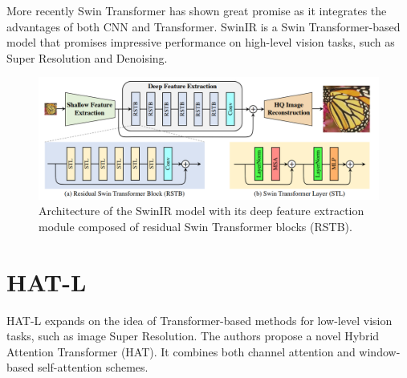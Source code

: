 More recently Swin Transformer\cite{liu2021swin}  has shown great promise as it integrates the advantages of both CNN and
Transformer. SwinIR\cite{liang2021swinir} is a Swin Transformer-based model that promises impressive performance on high-level vision tasks, such as Super Resolution and Denoising.

\begin{figure}[H]
  \centering
  \includegraphics[scale=0.35]{figures/SwinIR.png}
  \caption{Architecture of the SwinIR model with its deep feature extraction module composed of residual Swin Transformer blocks (RSTB)\cite{liang2021swinir}.}
  \label{img:swinir}
\end{figure}

\section{HAT-L}
\label{subsec:hatl}

HAT-L expands on the idea of Transformer-based methods for low-level vision tasks, such as image Super Resolution. The authors propose a novel Hybrid Attention Transformer (HAT). It combines both channel attention and window-based self-attention schemes.


